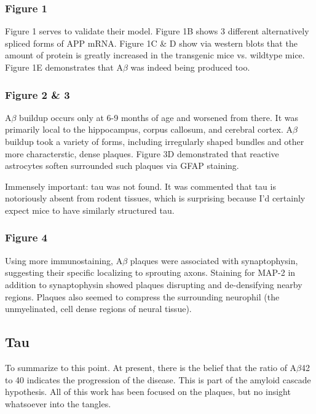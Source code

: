 \documentclass[12pt]{report}
\newcommand{\be}{\beta}
\begin{document}
\subsubsection*{Figure 1}

Figure 1 serves to validate their model. Figure 1B shows 3 different alternatively spliced forms of APP mRNA. Figure 1C \& D show via western blots that the amount of protein is greatly increased in the transgenic mice vs. wildtype mice. Figure 1E demonstrates that A$\be$ was indeed being produced too. 

\subsubsection*{Figure 2 \& 3}

 A$\be$ buildup occurs only at 6-9 months of age and worsened from there. It was primarily local to the hippocampus, corpus callosum, and cerebral cortex. A$\be$ buildup took a variety of forms, including irregularly shaped bundles and other more characterstic, dense plaques. Figure 3D demonstrated that reactive astrocytes soften surrounded such plaques via GFAP staining.\newline

Immensely important: tau was not found. It was commented that tau is notoriously absent from rodent tissues, which is surprising because I'd certainly expect mice to have similarly structured tau.

\subsubsection*{Figure 4}

Using more immunostaining, A$\be$ plaques were associated with synaptophysin, suggesting their specific localizing to sprouting axons.  Staining for MAP-2 in addition to synaptophysin showed plaques disrupting and de-densifying nearby regions. Plaques also seemed to compress the surrounding neurophil (the unmyelinated, cell dense regions of neural tissue). 


\subsection*{Tau}

 To summarize to this point. At present, there is the belief that the ratio of A$\be$42 to 40 indicates the progression of the disease. This is part of the amyloid cascade hypothesis. All of this work has been focused on the plaques, but no insight whatsoever into the tangles.\newline
\end{document}
